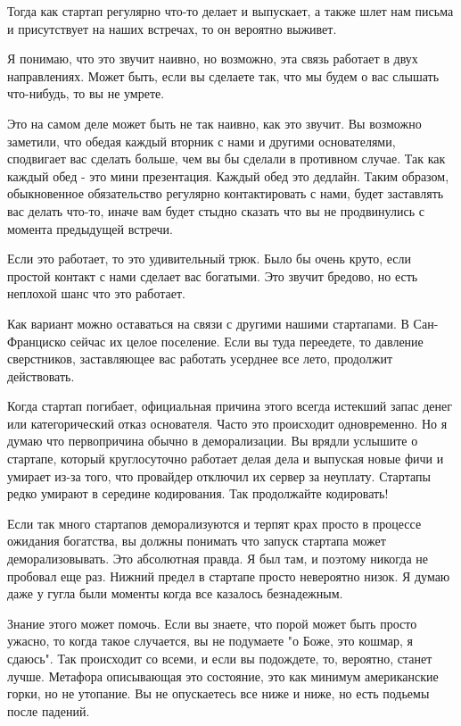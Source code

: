 \documentclass[ebook,12pt,oneside,openany]{memoir}
\begin{document}
Тогда как стартап регулярно что-то делает и выпускает, а также шлет
нам письма и присутствует на наших встречах, то он вероятно выживет.

Я понимаю, что это звучит наивно, но возможно, эта связь работает в
двух направлениях. Может быть, если вы сделаете так, что мы будем о
вас слышать что-нибудь, то вы не умрете.

Это на самом деле может быть не так наивно, как это звучит. Вы
возможно заметили, что обедая каждый вторник с нами и другими
основателями, сподвигает вас сделать больше, чем вы бы сделали в
противном случае. Так как каждый обед - это мини презентация. Каждый
обед это дедлайн. Таким образом, обыкновенное обязательство регулярно
контактировать с нами, будет заставлять вас делать что-то, иначе вам
будет стыдно сказать что вы не продвинулись с момента предыдущей
встречи.

Если это работает, то это удивительный трюк. Было бы очень круто, если
простой контакт с нами сделает вас богатыми. Это звучит бредово, но
есть неплохой шанс что это работает.

Как вариант можно оставаться на связи с другими нашими стартапами. В
Сан-Франциско сейчас их целое поселение. Если вы туда переедете, то
давление сверстников, заставляющее вас работать усерднее все лето,
продолжит действовать.

Когда стартап погибает, официальная причина этого всегда истекший
запас денег или категорический отказ основателя. Часто это происходит
одновременно. Но я думаю что первопричина обычно в деморализации. Вы
врядли услышите о стартапе, который круглосуточно работает делая дела
и выпуская новые фичи и умирает из-за того, что провайдер отключил их
сервер за неуплату. Стартапы редко умирают в середине кодирования. Так
продолжайте кодировать!

Если так много стартапов деморализуются и терпят крах просто в
процессе ожидания богатства, вы должны понимать что запуск стартапа
может деморализовывать. Это абсолютная правда. Я был там, и поэтому
никогда не пробовал еще раз. Нижний предел в стартапе просто
невероятно низок. Я думаю даже у гугла были моменты когда все казалось
безнадежным.

Знание этого может помочь. Если вы знаете, что порой может быть просто
ужасно, то когда такое случается, вы не подумаете "о Боже, это кошмар,
я сдаюсь". Так происходит со всеми, и если вы подождете, то, вероятно,
станет лучше. Метафора описывающая это состояние, это как минимум
американские горки, но не утопание. Вы не опускаетесь все ниже и ниже,
но есть подьемы после падений.
\end{document}
